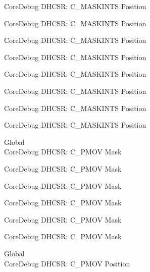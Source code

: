 \begin{DoxyRefList}
\label{deprecated__deprecated000711}%
%
Core\+Debug DHCSR\+: C\+\_\+\+MASKINTS Position 

\label{deprecated__deprecated000799}%
%
Core\+Debug DHCSR\+: C\+\_\+\+MASKINTS Position 

\label{deprecated__deprecated000855}%
%
Core\+Debug DHCSR\+: C\+\_\+\+MASKINTS Position 

\label{deprecated__deprecated000938}%
%
Core\+Debug DHCSR\+: C\+\_\+\+MASKINTS Position 

\label{deprecated__deprecated000997}%
%
Core\+Debug DHCSR\+: C\+\_\+\+MASKINTS Position 

\label{deprecated__deprecated001073}%
%
Core\+Debug DHCSR\+: C\+\_\+\+MASKINTS Position 

\label{deprecated__deprecated001162}%
%
Core\+Debug DHCSR\+: C\+\_\+\+MASKINTS Position 

\label{deprecated__deprecated001264}%
%
Core\+Debug DHCSR\+: C\+\_\+\+MASKINTS Position  
\item[Global \doxylink{group___c_m_s_i_s___s_c_b_ga6c41fddb98d97a17f3e9020278a1aed1}{Core\+Debug\+\_\+\+DHCSR\+\_\+\+C\+\_\+\+PMOV\+\_\+\+Msk} ]\hfill \\
\label{deprecated__deprecated000030}%
%
Core\+Debug DHCSR\+: C\+\_\+\+PMOV Mask 

\label{deprecated__deprecated000481}%
%
Core\+Debug DHCSR\+: C\+\_\+\+PMOV Mask 

\label{deprecated__deprecated000583}%
%
Core\+Debug DHCSR\+: C\+\_\+\+PMOV Mask 

\label{deprecated__deprecated000708}%
%
Core\+Debug DHCSR\+: C\+\_\+\+PMOV Mask 

\label{deprecated__deprecated001159}%
%
Core\+Debug DHCSR\+: C\+\_\+\+PMOV Mask 

\label{deprecated__deprecated001261}%
%
Core\+Debug DHCSR\+: C\+\_\+\+PMOV Mask  
\item[Global \doxylink{group___c_m_s_i_s___s_c_b_gac414659dd5c8bd9c91ab94441ded720a}{Core\+Debug\+\_\+\+DHCSR\+\_\+\+C\+\_\+\+PMOV\+\_\+\+Pos} ]\hfill \\
\label{deprecated__deprecated000029}%
%
Core\+Debug DHCSR\+: C\+\_\+\+PMOV Position 


\end{DoxyRefList}
